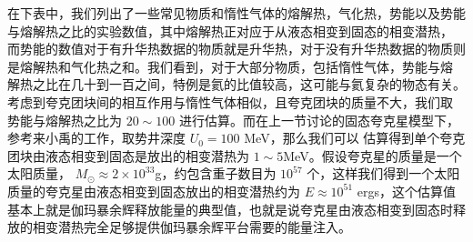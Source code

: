 						在下表中，我们列出了一些常见物质和惰性气体的熔解热，气化热，势能以及势能与熔解热之比的实验数值，其中熔解热正对应于从液态相变到固态的相变潜热，
						而势能的数值对于有升华热数据的物质就是升华热，对于没有升华热数据的物质则是熔解热和气化热之和。我们看到，对于大部分物质，包括惰性气体，势能与熔
						解热之比在几十到一百之间，特例是氦的比值较高，这可能与氦复杂的物态有关。考虑到夸克团块间的相互作用与惰性气体相似，且夸克团块的质量不大，我们取
						势能与熔解热之比为 $20\sim100$ 进行估算。而在上一节讨论的固态夸克星模型下，参考来小禹的工作，取势井深度 $U_{0}=100$ MeV，那么我们可以
						估算得到单个夸克团块由液态相变到固态是放出的相变潜热为 $1\sim5$MeV。假设夸克星的质量是一个太阳质量，
						$M_{\odot}\approx2\times10^{33}$g，约包含重子数目为 $10^{57}$ 个，这样我们得到一个太阳质量的夸克星由液态相变到固态放出的相变潜热约为 $E\approx10^{51}$ ergs，这个估算值基本上就是伽玛暴余辉释放能量的典型值，也就是说夸克星由液态相变到固态时释放的相变潜热完全足够提供伽玛暴余辉平台需要的能量注入。

